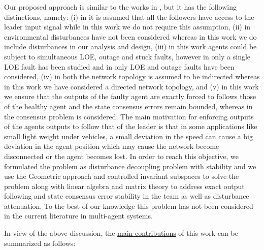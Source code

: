 \documentclass[12pt,draftcls,onecolumn]{IEEEtran}
\begin{document}
 Our proposed approach is similar to the works in \cite{Zhou2014, ECC2014}, but it has the following  distinctions, namely: (i) in \cite{Zhou2014} it is assumed that all the followers have access to the leader input signal while in this work {we do not} require this assumption,  (ii) in \cite{Zhou2014} environmental disturbances have not been considered whereas in this work {we do include} disturbances in our analysis and design, (iii) in this work agents could be subject to simultaneous LOE, outage and stuck faults, however in \cite{ECC2014} only a single LOE fault has been studied and in \cite{Zhou2014} only LOE and outage faults have been considered, (iv) in  both \cite{Zhou2014,ECC2014} the network topology is assumed to be indirected  whereas in this work we have considered a {directed network topology}, 
 and (v)  in this work we ensure that the outputs of the faulty agent are exactly  forced to follows those of the healthy agent and the state consensus errors remain bounded, whereas in \cite{Zhou2014,ECC2014} the consensus problem is considered. {The main motivation for enforcing outputs of the agents outputs to follow that of the leader is that in some applications like small light weight under vehicles, a small deviation in the speed can cause a big deviation in the agent position which may cause the network become disconnected or the agent becomes lost. In order to reach this objective, we formulated the problem as disturbance decoupling problem with stability and we use the Geometric approach \cite{Basile92} and controlled invariant subspaces to solve the problem along with linear algebra and matrix theory to address exact output following and state consensus error stability in the team as well as disturbance attenuation. To the best of our knowledge this problem has not been considered in the current literature in multi-agent systems.  }
 \par
 In view of the above discussion, the \underline{main contributions} of this work can be summarized as follows:
\end{document}
